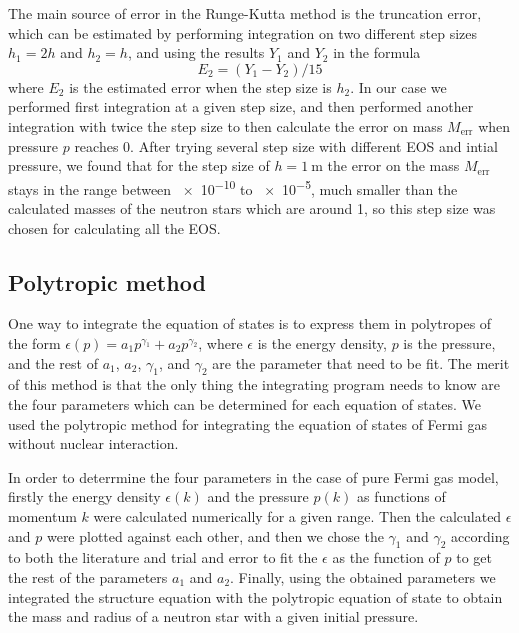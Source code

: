 \documentclass[draft,11pt]{article}
\theoremstyle{definition}
\theoremstyle{remark}
\begin{document}
            The main source of error in the Runge-Kutta method is the truncation error, which can be estimated by performing integration on two different step sizes $h_1=2h$ and $h_2=h$, and using the results $Y_1$ and $Y_2$ in the formula  \parencite{lotkin.1951/rk.accuracy} \[E_2=(Y_1-Y_2)/15\] where $E_2$ is the estimated error when the step size is $h_2$. In our case we performed first integration at a given step size, and then performed another integration with twice the step size to then calculate the error on mass $M_{\text{err}}$ when pressure $p$ reaches 0. After trying several step size with different EOS and intial pressure, we found that for the step size of $h=\SI{1}{\meter}$ the error on the mass $M_{\text{err}}$ stays in the range between \SI{e-10}{\solarmass} to \SI{e-5}{\solarmass}, much smaller than the calculated masses of the neutron stars which are around \SI{1}{\solarmass}, so this step size was chosen for calculating all the EOS.
        
        \subsection{Polytropic method}
            One way to integrate the equation of states is to express them in polytropes of the form $\epsilon(p) = a_1 p^{\gamma_1} + a_2 p^{\gamma_2}$, where $\epsilon$ is the energy density, $p$ is the pressure, and the rest of $a_1$, $a_2$, $\gamma_1$, and $\gamma_2$ are the parameter that need to be fit. The merit of this method is that the only thing the integrating program needs to know are the four parameters which can be determined for each equation of states. We used the polytropic method for integrating the equation of states of Fermi gas without nuclear interaction.


            In order to deterrmine the four parameters in the case of pure Fermi gas model, firstly the energy density $\epsilon(k)$ and the pressure $p(k)$ as functions of momentum $k$ were calculated numerically for a given range. Then the calculated $\epsilon$ and $p$ were plotted against each other, and then we chose the $\gamma_1$ and $\gamma_2$ according to both the literature and trial and error to fit the $\epsilon$ as the function of $p$ to get the rest of the parameters $a_1$ and $a_2$. Finally, using the obtained parameters we integrated the structure equation with the polytropic equation of state to obtain the mass and radius of a neutron star with a given initial pressure.
\end{document}
